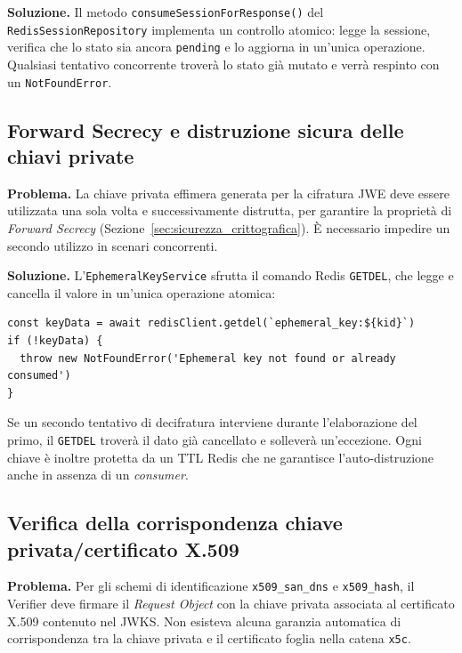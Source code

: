 \textbf{Soluzione.} Il metodo \texttt{consumeSessionForResponse()} del \texttt{RedisSessionRepository} implementa un controllo atomico: legge la sessione, verifica che lo stato sia ancora \texttt{pending} e lo aggiorna in un'unica operazione. Qualsiasi tentativo concorrente troverà lo stato già mutato e verrà respinto con un \texttt{NotFoundError}.

\subsection{Forward Secrecy e distruzione sicura delle chiavi private}
\textbf{Problema.} La chiave privata effimera generata per la cifratura JWE deve essere utilizzata una sola volta e successivamente distrutta, per garantire la proprietà di \textit{Forward Secrecy} (Sezione~\ref{sec:sicurezza_crittografica}). È necessario impedire un secondo utilizzo in scenari concorrenti.

\textbf{Soluzione.} L'\texttt{EphemeralKeyService} sfrutta il comando Redis \texttt{GETDEL}, che legge e cancella il valore in un'unica operazione atomica:

\begin{listing}[H]
\begin{verbatim}
const keyData = await redisClient.getdel(`ephemeral_key:${kid}`)
if (!keyData) {
  throw new NotFoundError('Ephemeral key not found or already consumed')
}
\end{verbatim}
\caption{Utilizzo del comando Redis GETDEL per la rimozione atomica delle chiavi effimere}
\label{listing:getdel}
\end{listing}

Se un secondo tentativo di decifratura interviene durante l'elaborazione del primo, il \texttt{GETDEL} troverà il dato già cancellato e solleverà un'eccezione. Ogni chiave è inoltre protetta da un TTL Redis che ne garantisce l'auto-distruzione anche in assenza di un \textit{consumer}.

\subsection{Verifica della corrispondenza chiave privata/certificato X.509}
\textbf{Problema.} Per gli schemi di identificazione \texttt{x509\_\allowbreak{}san\_\allowbreak{}dns} e \texttt{x509\_\allowbreak{}hash}, il Verifier deve firmare il \textit{Request Object} con la chiave privata associata al certificato X.509 contenuto nel JWKS. Non esisteva alcuna garanzia automatica di corrispondenza tra la chiave privata e il certificato foglia nella catena \texttt{x5c}.


